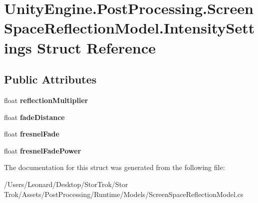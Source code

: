 \hypertarget{struct_unity_engine_1_1_post_processing_1_1_screen_space_reflection_model_1_1_intensity_settings}{}\section{Unity\+Engine.\+Post\+Processing.\+Screen\+Space\+Reflection\+Model.\+Intensity\+Settings Struct Reference}
\label{struct_unity_engine_1_1_post_processing_1_1_screen_space_reflection_model_1_1_intensity_settings}
\subsection*{Public Attributes}
\begin{DoxyCompactItemize}
\item 
\mbox{\label{struct_unity_engine_1_1_post_processing_1_1_screen_space_reflection_model_1_1_intensity_settings_a8ec48b86aaff338720873b3e43c49b2f}} 
float {\bfseries reflection\+Multiplier}
\item 
\mbox{\label{struct_unity_engine_1_1_post_processing_1_1_screen_space_reflection_model_1_1_intensity_settings_a50700644ca17276c6f9c09bbbe53254d}} 
float {\bfseries fade\+Distance}
\item 
\mbox{\label{struct_unity_engine_1_1_post_processing_1_1_screen_space_reflection_model_1_1_intensity_settings_a597e8b8b62d8004069320a12fb793efd}} 
float {\bfseries fresnel\+Fade}
\item 
\mbox{\label{struct_unity_engine_1_1_post_processing_1_1_screen_space_reflection_model_1_1_intensity_settings_ab03bececad8d540f7619542a5bb3f9fb}} 
float {\bfseries fresnel\+Fade\+Power}
\end{DoxyCompactItemize}


The documentation for this struct was generated from the following file\+:\begin{DoxyCompactItemize}
\item 
/\+Users/\+Leonard/\+Desktop/\+Stor\+Trok/\+Stor Trok/\+Assets/\+Post\+Processing/\+Runtime/\+Models/Screen\+Space\+Reflection\+Model.\+cs\end{DoxyCompactItemize}
